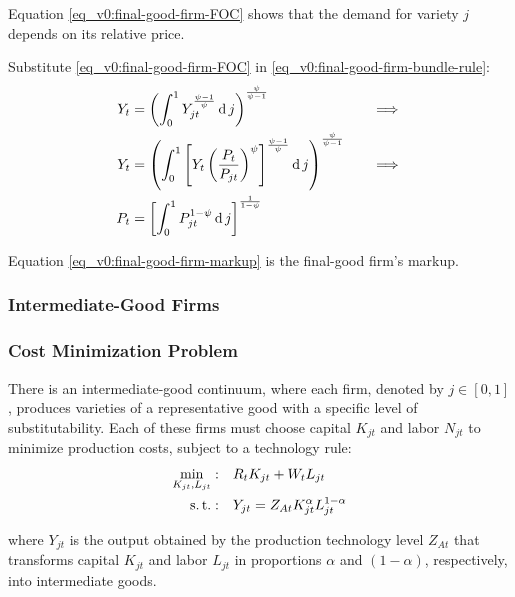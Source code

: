 \documentclass[../thesis.tex]{subfiles}
\begin{document}
	Equation \ref{eq_v0:final-good-firm-FOC} shows that the demand for variety $j$ depends on its relative price. 
	
	Substitute \ref{eq_v0:final-good-firm-FOC} in \ref{eq_v0:final-good-firm-bundle-rule}:
	\begin{alignat}{2}
		Y_t & = \left( \int_{0}^{1} Y_{jt}^{\frac{\psi-1}{\psi}} \operatorname{d} j \right)^{\frac{\psi}{\psi-1}} &\implies \nonumber \\
		Y_t & = \left( \int_{0}^{1} \left[ Y_t \left( \frac{P_t}{P_{jt}} \right)^{\psi} \right]^{\frac{\psi-1}{\psi}} \operatorname{d} j \right)^{\frac{\psi}{\psi-1}} \quad &\implies \nonumber \\
		P_t & = \left[ \int_{0}^{1} P_{jt}^{1-\psi} \operatorname{d} j \right]^{\frac{1}{1-\psi}} \label{eq_v0:final-good-firm-markup}
	\end{alignat}
	
	Equation \ref{eq_v0:final-good-firm-markup} is the final-good firm's markup.
	
	
	\subsubsection{Intermediate-Good Firms}
	
	\subsubsection*{Cost Minimization Problem}
	
	There is an intermediate-good continuum, where each firm, denoted by $j \in [0,1]$, produces varieties of a representative good with a specific level of substitutability. Each of these firms must choose capital $K_{jt}$ and labor $N_{jt}$ to minimize production costs, subject to a technology rule:
	\begin{align}
		\label{eq_v0:int-good-firm-total-cost}
		\min_{K_{jt}, L_{jt}}: \quad & R_t K_{jt} + W_t L_{jt} \\
		\label{eq_v0:int-good-firm-production-function}
		\operatorname{s.t.}: \quad & Y_{jt} = Z_{At} K_{jt}^\alpha L_{jt}^{1-\alpha}
	\end{align}
	
	where $Y_{jt}$ is the output obtained by the production technology level $Z_{At}$\footnotemark{} that transforms capital $K_{jt}$ and labor $L_{jt}$ in proportions $\alpha$ and $(1-\alpha)$, respectively, into intermediate goods.
	
\end{document}

